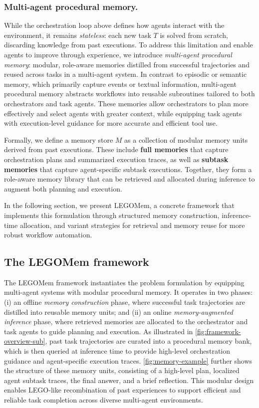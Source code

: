 \documentclass[sigconf]{aamas}
\newcommand{\legomem}{LEGOMem}
\begin{document}
\subsubsection{Multi-agent procedural memory.} 
While the orchestration loop above defines how agents interact with the environment, it remains \emph{stateless}: each new task $T$ is solved from scratch, discarding knowledge from past executions. 
To address this limitation and enable agents to improve through experience, we introduce \emph{multi-agent procedural memory}: modular, role-aware memories distilled from successful trajectories and reused across tasks in a multi-agent system. 
In contrast to episodic or semantic memory, which primarily capture events or textual information, multi-agent procedural memory abstracts workflows into reusable subroutines tailored to both orchestrators and task agents. 
These memories allow orchestrators to plan more effectively and select agents with greater context, while equipping task agents with execution-level guidance for more accurate and efficient tool use.


Formally, we define a memory store $M$ as a collection of modular memory units derived from past executions. 
These include \textbf{full memories} that capture orchestration plans and summarized execution traces, as well as \textbf{subtask memories} that capture agent-specific subtask executions. 
Together, they form a role-aware memory library that can be retrieved and allocated during inference to augment both planning and execution.

In the following section, we present \legomem{}, a concrete framework that implements this formulation through structured memory construction, inference-time allocation, and variant strategies for retrieval and memory reuse for more robust workflow automation.


\subsection{The \legomem{} framework}
\label{sec:legomem-framework}

The \legomem{} framework instantiates the problem formulation by equipping multi-agent systems with modular procedural memory. 
It operates in two phases: (i) an offline \emph{memory construction} phase, where successful task trajectories are distilled into reusable memory units; and (ii) an online \emph{memory-augmented inference} phase, where retrieved memories are allocated to the orchestrator and task agents to guide planning and execution. 
As illustrated in \autoref{fig:framework-overview-sub}, past task trajectories are curated into a procedural memory bank, which is then queried at inference time to provide high-level orchestration guidance and agent-specific execution traces. 
\autoref{fig:memory-example} further shows the structure of these memory units, consisting of a high-level plan, localized agent subtask traces, the final answer, and a brief reflection. 
This modular design enables LEGO-like recombination of past experiences to support efficient and reliable task completion across diverse multi-agent environments.
\end{document}
